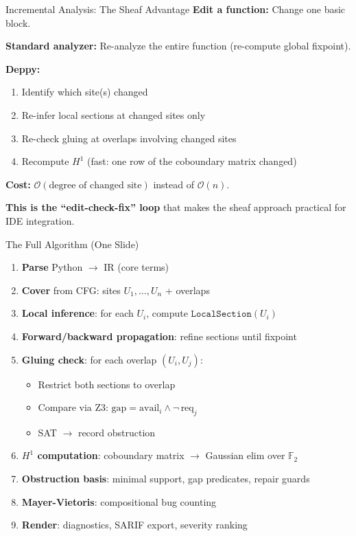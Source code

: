 \documentclass[aspectratio=169,10pt]{beamer}
\begin{document}
\begin{frame}{Incremental Analysis: The Sheaf Advantage}
\textbf{Edit a function:} Change one basic block.

\textbf{Standard analyzer:} Re-analyze the entire function (re-compute global fixpoint).

\textbf{Deppy:}
\begin{enumerate}
  \item Identify which site(s) changed
  \item Re-infer local sections at changed sites only
  \item Re-check gluing at overlaps involving changed sites
  \item Recompute $H^1$ (fast: one row of the coboundary matrix changed)
\end{enumerate}

\textbf{Cost:} $\mathcal{O}(\text{degree of changed site})$ instead of $\mathcal{O}(n)$.

\vspace{0.3em}
\textbf{This is the ``edit-check-fix'' loop} that makes the sheaf approach practical for IDE integration.
\end{frame}

\begin{frame}{The Full Algorithm (One Slide)}
\begin{enumerate}\small
  \item \textbf{Parse} Python $\to$ IR (core terms)
  \item \textbf{Cover} from CFG: sites $U_1, \ldots, U_n$ + overlaps
  \item \textbf{Local inference}: for each $U_i$, compute $\texttt{LocalSection}(U_i)$
  \item \textbf{Forward/backward propagation}: refine sections until fixpoint
  \item \textbf{Gluing check}: for each overlap $(U_i, U_j)$:
    \begin{itemize}\footnotesize
      \item Restrict both sections to overlap
      \item Compare via Z3: $\text{gap} = \text{avail}_i \wedge \lnot\,\text{req}_j$
      \item SAT $\to$ record obstruction
    \end{itemize}
  \item \textbf{$H^1$ computation}: coboundary matrix $\to$ Gaussian elim over $\mathbb{F}_2$
  \item \textbf{Obstruction basis}: minimal support, gap predicates, repair guards
  \item \textbf{Mayer-Vietoris}: compositional bug counting
  \item \textbf{Render}: diagnostics, SARIF export, severity ranking
\end{enumerate}
\end{frame}
\end{document}
